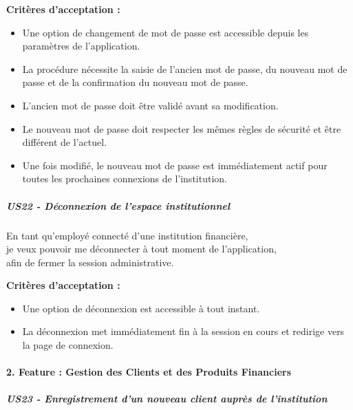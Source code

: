 \textbf{Critères d'acceptation :}

\begin{itemize}
\tightlist
\item
  Une option de changement de mot de passe est accessible depuis les
  paramètres de l'application.
\item
  La procédure nécessite la saisie de l'ancien mot de passe, du nouveau
  mot de passe et de la confirmation du nouveau mot de passe.
\item
  L'ancien mot de passe doit être validé avant sa modification.
\item
  Le nouveau mot de passe doit respecter les mêmes règles de sécurité et
  être différent de l'actuel.
\item
  Une fois modifié, le nouveau mot de passe est immédiatement actif pour
  toutes les prochaines connexions de l'institution.
\end{itemize}

\hypertarget{us22---duxe9connexion-de-lespace-institutionnel}{%
\subparagraph{US22 - Déconnexion de l'espace
institutionnel}\label{us22---duxe9connexion-de-lespace-institutionnel}}

En tant qu'employé connecté d'une institution financière,\\
je veux pouvoir me déconnecter à tout moment de l'application,\\
afin de fermer la session administrative.

\textbf{Critères d'acceptation :}

\begin{itemize}
\tightlist
\item
  Une option de déconnexion est accessible à tout instant.
\item
  La déconnexion met immédiatement fin à la session en cours et redirige
  vers la page de connexion.
\end{itemize}

\hypertarget{feature-gestion-des-clients-et-des-produits-financiers}{%
\paragraph{2. Feature : Gestion des Clients et des Produits
Financiers}\label{feature-gestion-des-clients-et-des-produits-financiers}}

\hypertarget{us23---enregistrement-dun-nouveau-client-aupruxe8s-de-linstitution}{%
\subparagraph{US23 - Enregistrement d'un nouveau client auprès de
l'institution}\label{us23---enregistrement-dun-nouveau-client-aupruxe8s-de-linstitution}}

